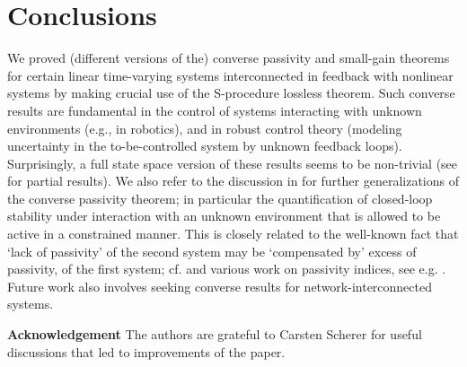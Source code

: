 \documentclass[11pt]{article}
\begin{document}
\section{Conclusions}

We proved (different versions of the) converse passivity and small-gain theorems for certain linear time-varying systems interconnected in feedback
with nonlinear systems by making crucial use of the S-procedure lossless theorem. Such converse results are fundamental in the control of systems
interacting with unknown environments (e.g., in robotics), and in robust control theory (modeling uncertainty in the to-be-controlled system
by unknown feedback loops). Surprisingly, a full state space version of these results seems to be non-trivial (see \cite{Str15} for partial
results). We also refer to the discussion in \cite{Str15} for further generalizations of the converse passivity theorem; in particular the
quantification of closed-loop stability under interaction with an unknown environment that is allowed to be active in a constrained manner. This is
closely related to the well-known fact that `lack of passivity' of the second system may be `compensated by' excess of passivity, of the first
system; cf. \cite[Theorem 2.2.18]{Sch17} and various work on passivity indices, see e.g. \cite{bao}. Future work also involves seeking converse
results for network-interconnected systems.

\medskip

{\bf Acknowledgement}
The authors are grateful to Carsten Scherer for useful discussions that led to improvements of the paper.
\end{document}
